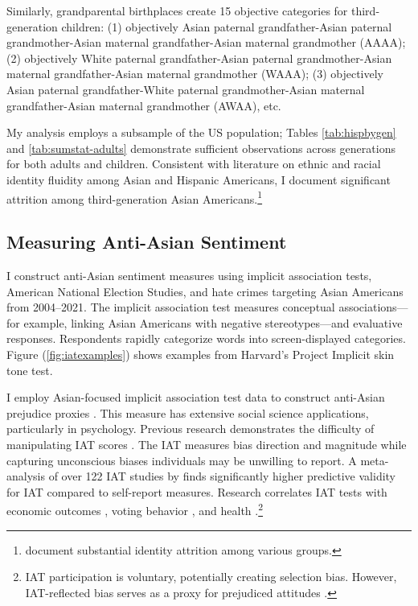 Similarly, grandparental birthplaces create 15 objective categories for third-generation children: (1) objectively Asian paternal grandfather-Asian paternal grandmother-Asian maternal grandfather-Asian maternal grandmother (AAAA); (2) objectively White paternal grandfather-Asian paternal grandmother-Asian maternal grandfather-Asian maternal grandmother (WAAA); (3) objectively Asian paternal grandfather-White paternal grandmother-Asian maternal grandfather-Asian maternal grandmother (AWAA), etc.

My analysis employs a subsample of the US population; Tables \ref{tab:hispbygen} and \ref{tab:sumstat-adults} demonstrate sufficient observations across generations for both adults and children. Consistent with literature on ethnic and racial identity fluidity among Asian and Hispanic Americans, I document significant attrition among third-generation Asian Americans.\footnote{\textcite{duncanIdentifyingLaterGenerationDescendants2018,duncanSocioeconomicIntegrationImmigrant2018, antmanEthnicAttritionObserved2016,antmanEthnicAttritionAssimilation2020} document substantial identity attrition among various groups.}

\subsection{Measuring Anti-Asian Sentiment}\label{sub:lw-bias}

I construct anti-Asian sentiment measures using implicit association tests, American National Election Studies, and hate crimes targeting Asian Americans from 2004--2021. The implicit association test measures conceptual associations---for example, linking Asian Americans with negative stereotypes---and evaluative responses. Respondents rapidly categorize words into screen-displayed categories. Figure (\ref{fig:iatexamples}) shows examples from Harvard's Project Implicit skin tone test.

I employ Asian-focused implicit association test data to construct anti-Asian prejudice proxies \autocite{greenwaldMeasuringIndividualDifferences1998}. This measure has extensive social science applications, particularly in psychology. Previous research demonstrates the difficulty of manipulating IAT scores \autocite{egloffPredictiveValidityImplicit2002}. The IAT measures bias direction and magnitude while capturing unconscious biases individuals may be unwilling to report. A meta-analysis of over 122 IAT studies by \textcite{greenwaldMeasuringIndividualDifferences1998} finds significantly higher predictive validity for IAT compared to self-report measures. Research correlates IAT tests with economic outcomes \autocite{chettyRaceEconomicOpportunity2020,gloverDiscriminationSelfFulfillingProphecy2017}, voting behavior \autocite{friesePredictingVotingBehavior2007}, and health \autocite{leitnerRacialBiasAssociated2016}.\footnote{IAT participation is voluntary, potentially creating selection bias. However, IAT-reflected bias serves as a proxy for prejudiced attitudes \autocite{chettyRaceEconomicOpportunity2020}.} 

